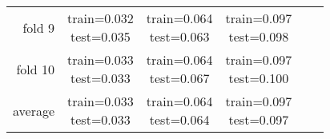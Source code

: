 \documentclass[12pt]{article}
\begin{document}
\begin{tabular}{ r|c|c|c|c|c| }
fold 9 & \shortstack{train=0.032 \\ test=0.035}& \shortstack{train=0.064 \\ test=0.063}& \shortstack{train=0.097 \\ test=0.098} \\\cline{2-4}
fold 10 & \shortstack{train=0.033 \\ test=0.033}& \shortstack{train=0.064 \\ test=0.067}& \shortstack{train=0.097 \\ test=0.100} \\\cline{2-4}
average & \shortstack{train=0.033 \\ test=0.033}& \shortstack{train=0.064 \\ test=0.064}& \shortstack{train=0.097 \\ test=0.097} \\\cline{2-4}
\end{tabular}
\end{document}
